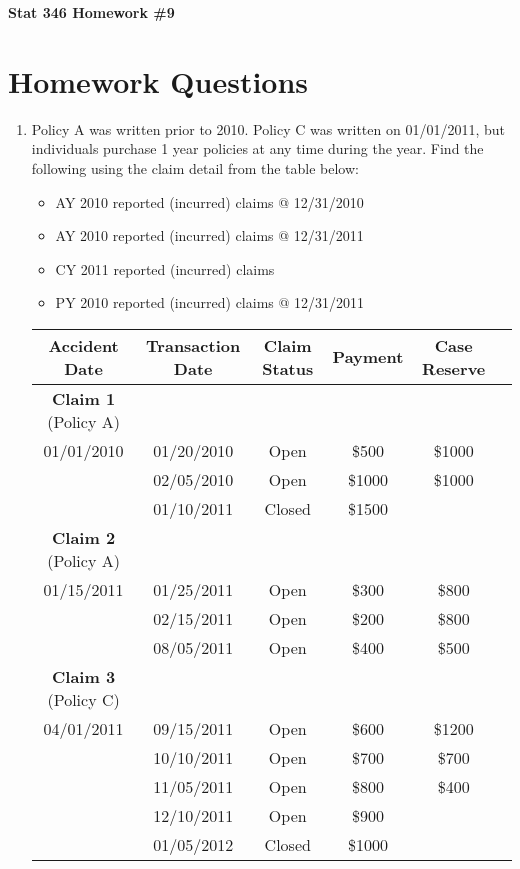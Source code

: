\documentclass{article}
\begin{document}
\begin{center}
\textbf{Stat 346 Homework \#9}\\
\vspace{0.3in}
\end{center}

\section*{Homework Questions}

\begin{enumerate}
   \item Policy A was written prior to 2010. Policy C was written on 01/01/2011, but individuals purchase 1 year policies at any time during the year. Find the following using the claim detail from the table below:
\begin{itemize}
    \item AY 2010 reported (incurred) claims @ 12/31/2010
    \item AY 2010 reported (incurred) claims @ 12/31/2011
    \item CY 2011 reported (incurred) claims
    \item PY 2010 reported (incurred) claims @ 12/31/2011
\end{itemize}

\begin{table}[htbp]
\centering
\begin{tabular}{cccccc}
\toprule
Accident Date & Transaction Date & Claim Status & Payment & Case Reserve \\
\midrule
\textbf{Claim 1} (Policy A) & & & & \\
01/01/2010 & 01/20/2010 & Open & \$500 & \$1000 \\
& 02/05/2010 & Open & \$1000 &  \$1000\\
& 01/10/2011 & Closed & \$1500 & \\
\midrule
\textbf{Claim 2} (Policy A) & & & & \\
01/15/2011 & 01/25/2011 & Open & \$300 & \$800 \\
& 02/15/2011 & Open & \$200 & \$800 \\
& 08/05/2011 & Open & \$400 & \$500 \\
\midrule
\textbf{Claim 3} (Policy C) & & & & \\
04/01/2011 & 09/15/2011 & Open & \$600 & \$1200 \\
& 10/10/2011 & Open & \$700 & \$700 \\
& 11/05/2011 & Open & \$800 & \$400 \\
& 12/10/2011 & Open & \$900 & \\
& 01/05/2012 & Closed & \$1000 & \\
\bottomrule
\end{tabular}
\end{table}


\end{enumerate}
\end{document}
